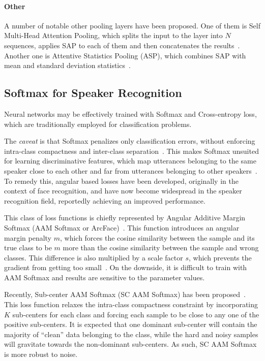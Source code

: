 \documentclass[conference]{IEEEtran}
\begin{document}
\paragraph{Other}A number of notable other pooling layers have been proposed. One of them is Self Multi-Head Attention Pooling, which splits the input to the layer into $N$ sequences, applies SAP to each of them and then concatenates the results~\cite{india2019selfmha}. Another one is Attentive Statistics Pooling (ASP), which combines SAP with mean and standard deviation statistics~\cite{okabe2018asp}.

\subsection{Softmax for Speaker Recognition}

Neural networks may be effectively trained with Softmax and Cross-entropy loss, which are traditionally employed for classification problems. 

The \textit{caveat} is that Softmax penalizes only classification errors, without enforcing intra-class compactness and inter-class separation~\cite{chung2020defence}. This makes Softmax unsuited for learning discriminative features, which map utterances belonging to the same speaker close to each other and far from utterances belonging to other speakers~\cite{liu2019large}. To remedy this, angular based losses have been developed, originally in the context of face recognition, and have now become widespread in the speaker recognition field, reportedly achieving an improved performance.

This class of loss functions is chiefly represented by Angular Additive Margin Softmax (AAM Softmax or ArcFace)~\cite{deng2019arcface}. This function introduces an angular margin penalty $m$, which forces the cosine similarity between the sample and its true class to be $m$ more than the cosine similarity between the sample and wrong classes. This difference is also multiplied by a scale factor $s$, which prevents the gradient from getting too small~\cite{chung2020defence,hajibabaei2018unified}. On the downside, it is difficult to train with AAM Softmax and results are sensitive to the parameter values.

Recently, Sub-center AAM Softmax (SC AAM Softmax) has been proposed~\cite{deng2020subarcface}. This loss function relaxes the intra-class compactness constraint by incorporating $K$ sub-centers for each class and forcing each sample to be close to any one of the positive sub-centers. It is expected that one dominant sub-center will contain the majority of ``clean'' data belonging to the class, while the hard and noisy samples will gravitate towards the non-dominant sub-centers. As such, SC AAM Softmax is more robust to noise.
\end{document}
